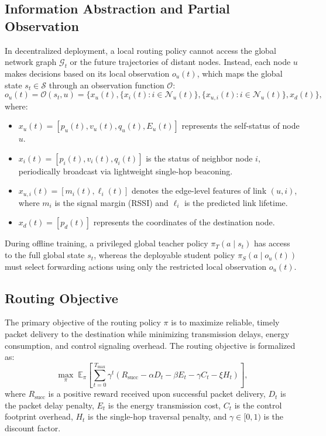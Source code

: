 \subsection{Information Abstraction and Partial Observation}
In decentralized deployment, a local routing policy cannot access the global network graph $\mathcal{G}_t$ or the future trajectories of distant nodes. Instead, each node $u$ makes decisions based on its local observation $o_u(t)$, which maps the global state $s_t \in \mathcal{S}$ through an observation function $\mathcal{O}$:
\begin{equation}
    o_u(t) = \mathcal{O}(s_t, u) = \{x_u(t), \{x_i(t) : i \in \mathcal{N}_u(t)\}, \{x_{u,i}(t) : i \in \mathcal{N}_u(t)\}, x_d(t)\},
\end{equation}
where:
\begin{itemize}
    \item $x_u(t) = [p_u(t), v_u(t), q_u(t), E_u(t)]$ represents the self-status of node $u$.
    \item $x_i(t) = [p_i(t), v_i(t), q_i(t)]$ is the status of neighbor node $i$, periodically broadcast via lightweight single-hop beaconing.
    \item $x_{u,i}(t) = [m_i(t), \ell_i(t)]$ denotes the edge-level features of link $(u, i)$, where $m_i$ is the signal margin (RSSI) and $\ell_i$ is the predicted link lifetime.
    \item $x_d(t) = [p_d(t)]$ represents the coordinates of the destination node.
\end{itemize}

During offline training, a privileged global teacher policy $\pi_T(a \mid s_t)$ has access to the full global state $s_t$, whereas the deployable student policy $\pi_S(a \mid o_u(t))$ must select forwarding actions using only the restricted local observation $o_u(t)$.

\subsection{Routing Objective}
The primary objective of the routing policy $\pi$ is to maximize reliable, timely packet delivery to the destination while minimizing transmission delays, energy consumption, and control signaling overhead. The routing objective is formalized as:
\begin{equation}
    \max_{\pi} \; \mathbb{E}_{\pi} \left[ \sum_{t=0}^{T_{\mathrm{max}}} \gamma^t \left( R_{\mathrm{succ}} - \alpha D_t - \beta E_t - \gamma C_t - \xi H_t \right) \right],
\end{equation}
where $R_{\mathrm{succ}}$ is a positive reward received upon successful packet delivery, $D_t$ is the packet delay penalty, $E_t$ is the energy transmission cost, $C_t$ is the control footprint overhead, $H_t$ is the single-hop traversal penalty, and $\gamma \in [0, 1)$ is the discount factor.

